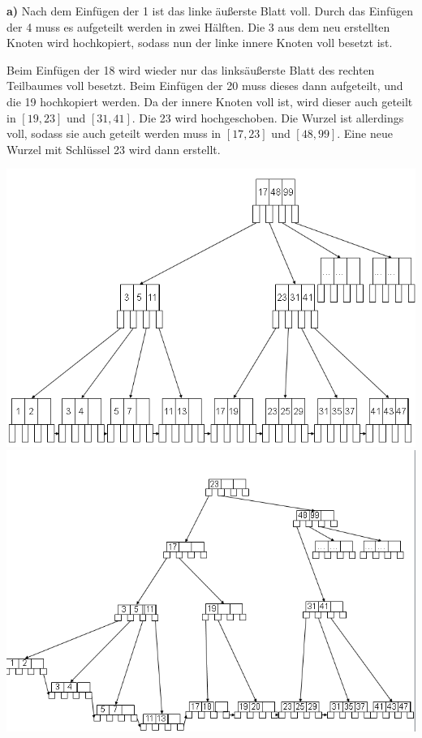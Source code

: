 \documentclass[12pt]{article}
\begin{document}
\textbf{a)} Nach dem Einfügen der 1 ist das linke äußerste Blatt voll. Durch das
Einfügen der 4 muss es aufgeteilt werden in zwei Hälften. Die 3 aus dem neu
erstellten Knoten wird hochkopiert, sodass nun der linke innere Knoten voll
besetzt ist.

Beim Einfügen der 18 wird wieder nur das linksäußerste Blatt des rechten
Teilbaumes voll besetzt. Beim Einfügen der 20 muss dieses dann aufgeteilt,
und die 19 hochkopiert werden. Da der innere Knoten voll ist, wird dieser auch
geteilt in $[19,23]$ und $[31,41]$. Die 23 wird hochgeschoben. Die Wurzel ist
allerdings voll, sodass sie auch geteilt werden muss in $[17,23]$ und $[48,99]$.
Eine neue Wurzel mit Schlüssel 23 wird dann erstellt.

\begin{center}
    \includegraphics{insert_4.PNG}
    \includegraphics{insert_20.PNG}
\end{center}
\end{document}
